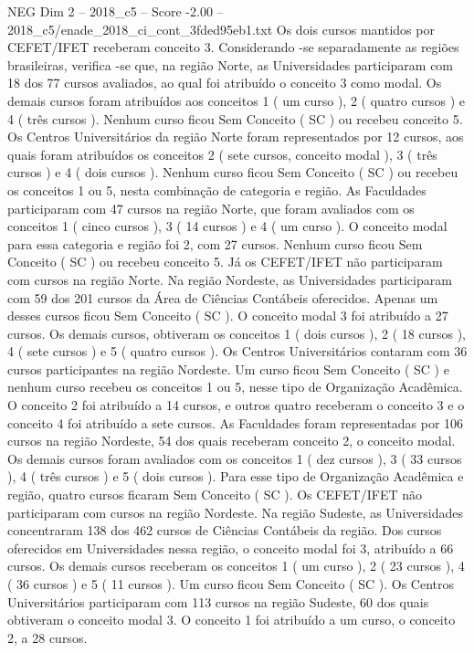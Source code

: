 \begin{textsample}{NEG Dim 2 – 2018\_c5 – Score -2.00 – 2018\_c5/enade\_2018\_ci\_cont\_3fded95eb1.txt}
Os dois cursos mantidos por CEFET/IFET receberam conceito 3.
Considerando -se separadamente as regiões brasileiras, verifica -se que, na região Norte, as Universidades participaram com 18 dos 77 cursos avaliados, ao qual foi atribuído o conceito 3 como modal.
Os demais cursos foram atribuídos aos conceitos 1 ( um curso ), 2 ( quatro cursos ) e 4 ( três cursos ).
Nenhum curso ficou Sem Conceito ( SC ) ou recebeu conceito 5.
Os Centros Universitários da região Norte foram representados por 12 cursos, aos quais foram atribuídos os conceitos 2 ( sete cursos, conceito modal ), 3 ( três cursos ) e 4 ( dois cursos ).
Nenhum curso ficou Sem Conceito ( SC ) ou recebeu os conceitos 1 ou 5, nesta combinação de categoria e região.
As Faculdades participaram com 47 cursos na região Norte, que foram avaliados com os conceitos 1 ( cinco cursos ), 3 ( 14 cursos ) e 4 ( um curso ).
O conceito modal para essa categoria e região foi 2, com 27 cursos.
Nenhum curso ficou Sem Conceito ( SC ) ou recebeu conceito 5.
Já os CEFET/IFET não participaram com cursos na região Norte.
Na região Nordeste, as Universidades participaram com 59 dos 201 cursos da Área de Ciências Contábeis oferecidos.
Apenas um desses cursos ficou Sem Conceito ( SC ).
O conceito modal 3 foi atribuído a 27 cursos.
Os demais cursos, obtiveram os conceitos 1 ( dois cursos ), 2 ( 18 cursos ), 4 ( sete cursos ) e 5 ( quatro cursos ).
Os Centros Universitários contaram com 36 cursos participantes na região Nordeste.
Um curso ficou Sem Conceito ( SC ) e nenhum curso recebeu os conceitos 1 ou 5, nesse tipo de Organização Acadêmica.
O conceito 2 foi atribuído a 14 cursos, e outros quatro receberam o conceito 3 e o conceito 4 foi atribuído a sete cursos.
As Faculdades foram representadas por 106 cursos na região Nordeste, 54 dos quais receberam conceito 2, o conceito modal.
Os demais cursos foram avaliados com os conceitos 1 ( dez cursos ), 3 ( 33 cursos ), 4 ( três cursos ) e 5 ( dois cursos ).
Para esse tipo de Organização Acadêmica e região, quatro cursos ficaram Sem Conceito ( SC ).
Os CEFET/IFET não participaram com cursos na região Nordeste.
Na região Sudeste, as Universidades concentraram 138 dos 462 cursos de Ciências Contábeis da região.
Dos cursos oferecidos em Universidades nessa região, o conceito modal foi 3, atribuído a 66 cursos.
Os demais cursos receberam os conceitos 1 ( um curso ), 2 ( 23 cursos ), 4 ( 36 cursos ) e 5 ( 11 cursos ).
Um curso ficou Sem Conceito ( SC ).
Os Centros Universitários participaram com 113 cursos na região Sudeste, 60 dos quais obtiveram o conceito modal 3.
O conceito 1 foi atribuído a um curso, o conceito 2, a 28 cursos.

\end{textsample}
